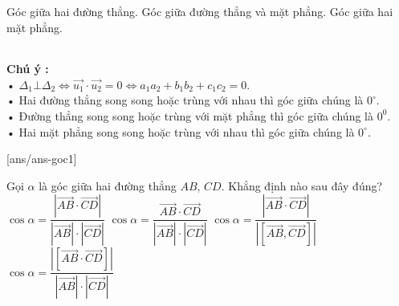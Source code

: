 \begin{dang}{Góc giữa hai đường thẳng. Góc giữa đường thẳng và mặt phẳng. Góc giữa hai mặt phẳng.}
\begin{tabular}{c|c|c}
		\end{tabular}
	\textbf{Chú ý :}\\
	• $\Delta_1\bot{\Delta_2}\Leftrightarrow{\overrightarrow {u_1}}\cdot \overrightarrow {u_2}=0\Leftrightarrow{a_1}{a_2}+b_1b_2+c_1c_2=0.$\\
	• Hai đường thẳng song song hoặc trùng với nhau thì góc giữa chúng là $0^\circ$.\\
	• Đường thẳng song song hoặc trùng với mặt phẳng thì góc giữa chúng là $0^0$.\\
	• Hai mặt phẳng song song hoặc trùng với nhau thì góc giữa chúng là $0^\circ$.
\end{dang}

[ans/ans-goc1]
\TN
\begin{ex}%
	Gọi $\alpha $ là góc giữa hai đường thẳng $AB$, $CD$. Khẳng định nào sau đây đúng?
	\choice
	{\True $\cos\alpha=\dfrac{\left|\overrightarrow{AB}\cdot\overrightarrow{CD}\right|}{\left|\overrightarrow{AB}\right|\cdot \left|\overrightarrow{CD}\right|}$}
	{$\cos\alpha=\dfrac{\overrightarrow{AB}\cdot\overrightarrow{CD}}{\left|\overrightarrow{AB}\right|\cdot \left|\overrightarrow{CD}\right|}$}
	{$\cos\alpha=\dfrac{\left|\overrightarrow{AB}\cdot\overrightarrow{CD}\right|}{\left|\left[\overrightarrow{AB},\overrightarrow{CD}\right]\right|}$}
	{$\cos\alpha=\dfrac{\left|\left[\overrightarrow{AB}\cdot \overrightarrow{CD}\right]\right|}{\left|\overrightarrow{AB}\right|\cdot \left|\overrightarrow{CD}\right|} $}
	
\end{ex}

